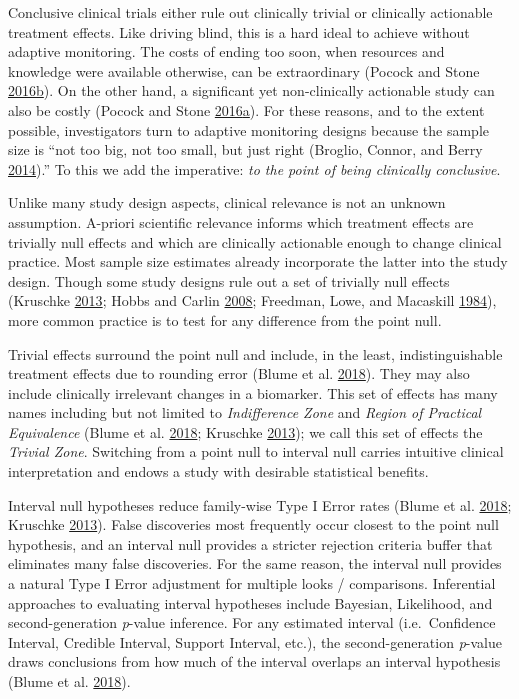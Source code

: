 \documentclass[12pt,oneside]{book}
\newlength{\li}\setlength{\li}{14.48pt}
\newlength{\di}\setlength{\di}{-3.5mm}
\theoremstyle{definition}
\theoremstyle{definition}
\theoremstyle{definition}
\theoremstyle{remark}
\begin{document}
Conclusive clinical trials either rule out clinically trivial or
clinically actionable treatment effects. Like driving blind, this is a
hard ideal to achieve without adaptive monitoring. The costs of ending
too soon, when resources and knowledge were available otherwise, can be
extraordinary (Pocock and Stone
\protect\hyperlink{ref-Pocock:2016ca}{2016}\protect\hyperlink{ref-Pocock:2016ca}{b}).
On the other hand, a significant yet non-clinically actionable study can
also be costly (Pocock and Stone
\protect\hyperlink{ref-Pocock:2016ey}{2016}\protect\hyperlink{ref-Pocock:2016ey}{a}).
For these reasons, and to the extent possible, investigators turn to
adaptive monitoring designs because the sample size is ``not too big,
not too small, but just right (Broglio, Connor, and Berry
\protect\hyperlink{ref-Broglio:2014fr}{2014}).'' To this we add the
imperative: \emph{to the point of being clinically conclusive}.

Unlike many study design aspects, clinical relevance is not an unknown
assumption. A-priori scientific relevance informs which treatment
effects are trivially null effects and which are clinically actionable
enough to change clinical practice. Most sample size estimates already
incorporate the latter into the study design. Though some study designs
rule out a set of trivially null effects (Kruschke
\protect\hyperlink{ref-Kruschke:2013jy}{2013}; Hobbs and Carlin
\protect\hyperlink{ref-Hobbs:2008ce}{2008}; Freedman, Lowe, and
Macaskill \protect\hyperlink{ref-Freedman:1984wz}{1984}), more common
practice is to test for any difference from the point null.

Trivial effects surround the point null and include, in the least,
indistinguishable treatment effects due to rounding error (Blume et al.
\protect\hyperlink{ref-Blume:SGPV}{2018}). They may also include
clinically irrelevant changes in a biomarker. This set of effects has
many names including but not limited to \emph{Indifference Zone} and
\emph{Region of Practical Equivalence} (Blume et al.
\protect\hyperlink{ref-Blume:SGPV}{2018}; Kruschke
\protect\hyperlink{ref-Kruschke:2013jy}{2013}); we call this set of
effects the \emph{Trivial Zone}. Switching from a point null to interval
null carries intuitive clinical interpretation and endows a study with
desirable statistical benefits.

Interval null hypotheses reduce family-wise Type I Error rates (Blume et
al. \protect\hyperlink{ref-Blume:SGPV}{2018}; Kruschke
\protect\hyperlink{ref-Kruschke:2013jy}{2013}). False discoveries most
frequently occur closest to the point null hypothesis, and an interval
null provides a stricter rejection criteria buffer that eliminates many
false discoveries. For the same reason, the interval null provides a
natural Type I Error adjustment for multiple looks / comparisons.
Inferential approaches to evaluating interval hypotheses include
Bayesian, Likelihood, and second-generation \emph{p}-value inference.
For any estimated interval (i.e.~Confidence Interval, Credible Interval,
Support Interval, etc.), the second-generation \emph{p}-value draws
conclusions from how much of the interval overlaps an interval
hypothesis (Blume et al. \protect\hyperlink{ref-Blume:SGPV}{2018}).
\end{document}

